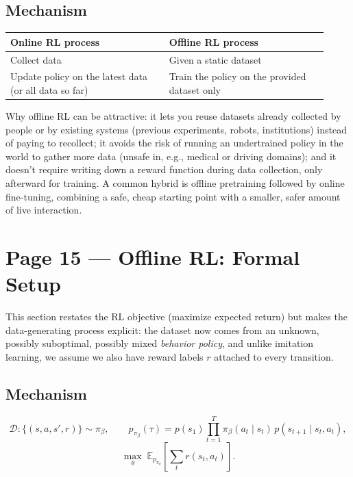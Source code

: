 \documentclass[11pt]{article}
\begin{document}
\subsection*{Mechanism}

\begin{center}
\begin{tabular}{@{}p{0.46\linewidth}p{0.46\linewidth}@{}}
\toprule
Online RL process & Offline RL process \\
\midrule
Collect data & Given a static dataset \\
Update policy on the latest data (or all data so far) & Train the policy on the provided dataset only \\
\bottomrule
\end{tabular}
\end{center}

Why offline RL can be attractive: it lets you reuse datasets already collected by people or by existing systems (previous experiments, robots, institutions) instead of paying to recollect; it avoids the risk of running an undertrained policy in the world to gather more data (unsafe in, e.g., medical or driving domains); and it doesn't require writing down a reward function during data collection, only afterward for training. A common hybrid is offline pretraining followed by online fine-tuning, combining a safe, cheap starting point with a smaller, safer amount of live interaction.

\section*{Page 15 --- Offline RL: Formal Setup}

This section restates the RL objective (maximize expected return) but makes the data-generating process explicit: the dataset now comes from an unknown, possibly suboptimal, possibly mixed \emph{behavior policy}, and unlike imitation learning, we assume we also have reward labels $r$ attached to every transition.

\subsection*{Mechanism}

\[
\mathcal{D} : \{(s,a,s',r)\} \sim \pi_\beta, \qquad
p_{\pi_\beta}(\tau) = p(s_1)\prod_{t=1}^{T} \pi_\beta(a_t\mid s_t)\, p(s_{t+1}\mid s_t,a_t),
\]
\[
\max_\theta\; \mathbb{E}_{p_{\pi_\theta}}\left[\sum_t r(s_t,a_t)\right].
\]
\end{document}
